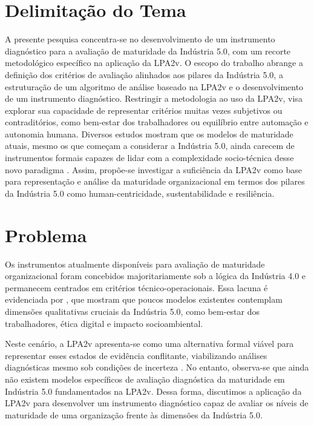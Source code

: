 \section{Delimitação do Tema}

A presente pesquisa concentra-se no desenvolvimento de um instrumento diagnóstico para a avaliação de maturidade da Indústria 5.0, com um recorte metodológico específico na aplicação da \gls{LPA2v}. O escopo do trabalho abrange a definição dos critérios de avaliação alinhados aos pilares da Indústria 5.0, a estruturação de um algoritmo de análise baseado na \gls{LPA2v} e o desenvolvimento de um instrumento diagnóstico. Restringir a metodologia ao uso da \gls{LPA2v}, visa explorar sua capacidade de representar critérios muitas vezes subjetivos ou contraditórios, como bem-estar dos trabalhadores ou equilíbrio entre automação e autonomia humana. Diversos estudos mostram que os modelos de maturidade atuais, mesmo os que começam a considerar a Indústria 5.0, ainda carecem de instrumentos formais capazes de lidar com a complexidade socio-técnica desse novo paradigma \cite{BARO2025, HeinPensel2023}. Assim, propõe-se investigar a suficiência da \gls{LPA2v} como base para representação e análise da maturidade organizacional em termos dos pilares da Indústria 5.0 como human-centricidade, sustentabilidade e resiliência.

\section{Problema}

Os instrumentos atualmente disponíveis para avaliação de maturidade organizacional foram concebidos majoritariamente sob a lógica da Indústria 4.0 e permanecem centrados em critérios técnico-operacionais. Essa lacuna é evidenciada por , que mostram que poucos modelos existentes contemplam dimensões qualitativas cruciais da Indústria 5.0, como bem-estar dos trabalhadores, ética digital e impacto socioambiental.

Neste cenário, a \gls{LPA2v} apresenta-se como uma alternativa formal viável para representar esses estados de evidência conflitante, viabilizando análises diagnósticas mesmo sob condições de incerteza \cite{JoseSilvaFilho2006, CarvalhoBrunsteinAbe2003, CarvalhoJunior2024}. No entanto, observa-se que ainda não existem modelos específicos de avaliação diagnóstica da maturidade em Indústria 5.0 fundamentados na \gls{LPA2v}. Dessa forma, discutimos a aplicação da \gls{LPA2v} para desenvolver um instrumento diagnóstico capaz de avaliar os níveis de maturidade de uma organização frente às dimensões da Indústria 5.0.

